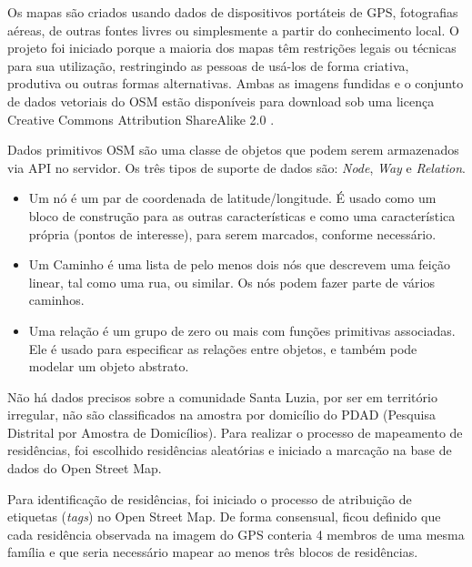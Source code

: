 Os mapas são criados usando dados de dispositivos portáteis de GPS, fotografias aéreas, de outras fontes livres ou simplesmente a partir do conhecimento local. O projeto foi iniciado porque a maioria dos mapas têm restrições legais ou técnicas para sua utilização, restringindo as pessoas de usá-los de forma criativa, produtiva ou outras formas alternativas. Ambas as imagens fundidas e o conjunto de dados vetoriais do OSM estão disponíveis para download sob uma licença Creative Commons Attribution ShareAlike 2.0 \cite{OpenStre2:online}.

Dados primitivos OSM são uma classe de objetos que podem serem armazenados via API no servidor. Os três tipos de suporte de dados são: \textit{Node}, \textit{Way} e \textit{Relation}. \cite{OpenStre2:online}

\begin{itemize}
\item Um nó é um par de coordenada de latitude/longitude. É usado como um bloco de construção para as outras características e como uma característica própria (pontos de interesse), para serem marcados, conforme necessário.
\item Um Caminho é uma lista de pelo menos dois nós que descrevem uma feição linear, tal como uma rua, ou similar. Os nós podem fazer parte de vários caminhos.
\item Uma relação é um grupo de zero ou mais com funções primitivas associadas. Ele é usado para especificar as relações entre objetos, e também pode modelar um objeto abstrato.
\end{itemize}

Não há dados precisos sobre a comunidade Santa Luzia, por ser em território irregular, não são classificados na amostra por domicílio do PDAD (Pesquisa Distrital por Amostra de Domicílios). Para realizar o processo de mapeamento de residências, foi escolhido residências aleatórias e iniciado a marcação na base de dados do Open Street Map.


Para identificação de residências, foi iniciado o processo de atribuição de etiquetas (\textit{tags}) no Open Street Map. De forma consensual, ficou definido que cada residência observada na imagem do GPS conteria 4 membros de uma mesma família e que seria necessário mapear ao menos três blocos de residências.


